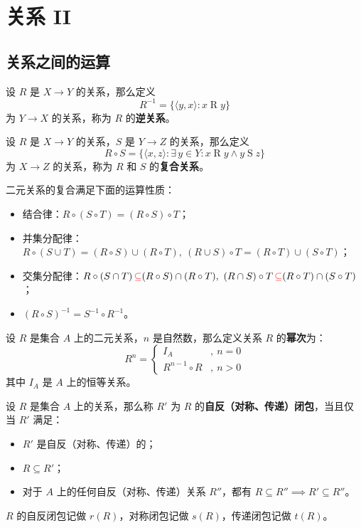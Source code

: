 \section{关系 II}

\subsection{关系之间的运算}

\begin{definition}[关系的逆]
    设 $R$ 是 $X \to Y$ 的关系，那么定义
    $$
    R^{-1} = \{\langle y, x \rangle: x \mathop{R} y\}
    $$
    为 $Y \to X$ 的关系，称为 $R$ 的\textbf{逆关系}。
\end{definition}

\begin{definition}[关系的复合]
    设 $R$ 是 $X \to Y$ 的关系，$S$ 是 $Y \to Z$ 的关系，那么定义
    $$
    R \circ S = \{\langle x, z \rangle: \exists\,y \in Y: x \mathop{R} y \land y \mathop{S} z\}
    $$
    为 $X \to Z$ 的关系，称为 $R$ 和 $S$ 的\textbf{复合关系}。
\end{definition}

二元关系的复合满足下面的运算性质：

\begin{itemize}
    \item 结合律：$R \circ (S \circ T) = (R \circ S) \circ T$；
    \item 并集分配律：$R \circ (S \cup T) = (R \circ S) \cup (R \circ T),\ (R \cup S) \circ T = (R \circ T) \cup (S \circ T)$；
    \item 交集分配律：$R \circ (S \cap T) \mathop{\color{red} \subseteq} (R \circ S) \cap (R \circ T),\ (R \cap S) \circ T \mathop{\color{red}\subseteq} (R \circ T) \cap (S \circ T)$；
    \item $(R \circ S)^{-1} = S^{-1} \circ R^{-1}$。
\end{itemize}

\begin{definition}[关系的幂次]
    设 $R$ 是集合 $A$ 上的二元关系，$n$ 是自然数，那么定义关系 $R$ 的\textbf{幂次}为：
    $$
    R^{n} = \begin{cases}
        I_A &,\ n = 0 \\
        R^{n - 1} \circ R &,\ n > 0
    \end{cases}
    $$
    其中 $I_A$ 是 $A$ 上的恒等关系。
\end{definition}

\begin{definition}[关系的闭包]
    设 $R$ 是集合 $A$ 上的关系，那么称 $R'$ 为 $R$ 的\textbf{自反（对称、传递）闭包}，当且仅当 $R'$ 满足：
    \begin{itemize}
        \item $R'$ 是自反（对称、传递）的；
        \item $R \subseteq R'$；
        \item 对于 $A$ 上的任何自反（对称、传递）关系 $R''$，都有 $R \subseteq R'' \implies R' \subseteq R''$。
    \end{itemize}

    $R$ 的自反闭包记做 $r(R)$，对称闭包记做 $s(R)$，传递闭包记做 $t(R)$。
\end{definition}

